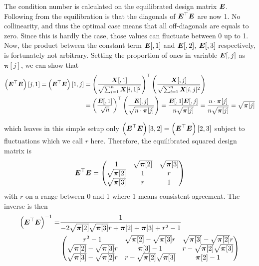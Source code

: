 \documentclass[11pt,a4paper,twoside]{book}\usepackage[]{graphicx}\usepackage[]{xcolor}
\begin{document}
The condition number is calculated on the equilibrated design matrix ${\boldsymbol{E}}$.
Following from the equilibration is that the diagonals of ${\boldsymbol{E}}^\top{\boldsymbol{E}}$ are now 1. No collinearity, and thus the optimal case means that all off-diagonals are equals to zero. Since this is hardly the case, those values can fluctuate between 0 up to 1. Now, the product between the constant term ${\boldsymbol{E}}[,1]$ and ${\boldsymbol{E}}[,2]$, ${\boldsymbol{E}}[,3]$ respectively, is fortunately not arbitrary. Setting the proportion of ones in variable ${\boldsymbol{E}}[,j]$ as $\boldsymbol{\pi}[j]$, we can show that
\begin{align*}
\left({\boldsymbol{E}}^\top{\boldsymbol{E}}\right)[j,1]=\left({\boldsymbol{E}}^\top{\boldsymbol{E}}\right)[1,j]&=\left(\frac{{\boldsymbol{X}}[,1]}{\sqrt{\sum_{i=1}^{n}{\boldsymbol{X}}[i,1]^2}}\right)^\top\left(\frac{{\boldsymbol{X}}[,j]}{\sqrt{\sum_{i=1}^{n}{\boldsymbol{X}}[i,j]^2}}\right)\\
&=\left(\frac{{\boldsymbol{E}}[,1]}{\sqrt{n}}\right)^\top\left(\frac{{\boldsymbol{E}}[,j]}{\sqrt{n\cdot \boldsymbol{\pi}[j]}}\right)
=\frac{{\boldsymbol{E}}[,1]{\boldsymbol{E}}[,j]}{n\sqrt{\boldsymbol{\pi}[j]}}=\frac{n\cdot \boldsymbol{\pi}[j]}{n\sqrt{\boldsymbol{\pi}[j]}}=\sqrt{\boldsymbol{\pi}[j]}
\end{align*}

which leaves in this simple setup only $\left({\boldsymbol{E}}^\top{\boldsymbol{E}}\right)[3,2]=\left({\boldsymbol{E}}^\top{\boldsymbol{E}}\right)[2,3]$ subject to fluctuations which we call $r$ here. Therefore, the equilibrated squared design matrix is
\begin{align*}
{\boldsymbol{E}}^\top{\boldsymbol{E}}=\begin{pmatrix}
1 & \sqrt{\boldsymbol{\pi}[2]} & \sqrt{\boldsymbol{\pi}[3]}\\
\sqrt{\boldsymbol{\pi}[2]} & 1 & r\\
\sqrt{\boldsymbol{\pi}[3]} & r & 1
\end{pmatrix}
\end{align*}
with $r$ on a range between 0 and 1 where 1 means consistent agreement. The inverse is then
\begin{align}
\left({\boldsymbol{E}}^\top{\boldsymbol{E}}\right)^{-1}=&
\frac{1}{- 2\sqrt{\boldsymbol{\pi}[2]} \sqrt{\boldsymbol{\pi}[3]}r+ \boldsymbol{\pi}[2] +\boldsymbol{\pi}[3]+r^2-1 }\nonumber\\
&\begin{pmatrix}
r^2 - 1 & \sqrt{\boldsymbol{\pi}[2]} -\sqrt{\boldsymbol{\pi}[3]}r & \sqrt{\boldsymbol{\pi}[3]}-\sqrt{\boldsymbol{\pi}[2]}r\\
\sqrt{\boldsymbol{\pi}[2]} -\sqrt{\boldsymbol{\pi}[3]}r & \boldsymbol{\pi}[3]-1  & r-\sqrt{\boldsymbol{\pi}[2]}\sqrt{\boldsymbol{\pi}[3]}\\
\sqrt{\boldsymbol{\pi}[3]}-\sqrt{\boldsymbol{\pi}[2]}r & r-\sqrt{\boldsymbol{\pi}[2]}\sqrt{\boldsymbol{\pi}[3]} & \boldsymbol{\pi}[2]-1
\end{pmatrix}
\label{eq:inv}
\end{align}
\end{document}
